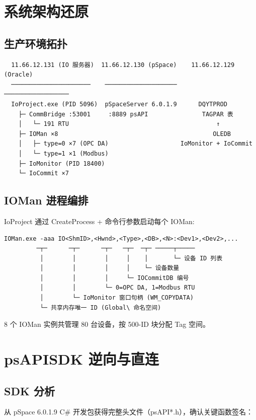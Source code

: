 \documentclass[12pt,a4paper]{ctexart}
\begin{document}
\section{系统架构还原}

\subsection{生产环境拓扑}
\begin{verbatim}
  11.66.12.131 (IO 服务器)  11.66.12.130 (pSpace)    11.66.12.129 (Oracle)
  ──────────────────────    ────────────────────      ──────────────────
  IoProject.exe (PID 5096)  pSpaceServer 6.0.1.9      DQYTPROD
    ├─ CommBridge :53001     :8889 psAPI               TAGPAR 表
    │   └─ 191 RTU                                         ↑
    ├─ IOMan ×8                                           OLEDB
    │   ├─ type=0 ×7 (OPC DA)                    IoMonitor + IoCommit
    │   └─ type=1 ×1 (Modbus)
    ├─ IoMonitor (PID 18400)
    └─ IoCommit ×7
\end{verbatim}

\subsection{IOMan 进程编排}
IoProject 通过 CreateProcess + 命令行参数启动每个 IOMan:

\begin{verbatim}
IOMan.exe -aaa IO<ShmID>,<Hwnd>,<Type>,<DB>,<N>:<Dev1>,<Dev2>,...
         ─┬─      ─┬─      ─┬─   ─┬─  ─┬─ ─────┬─────
          │        │        │     │    │       └─ 设备 ID 列表
          │        │        │     │    └─ 设备数量
          │        │        │     └─ IOCommitDB 编号
          │        │        └─ 0=OPC DA, 1=Modbus RTU
          │        └─ IoMonitor 窗口句柄 (WM_COPYDATA)
          └─ 共享内存唯一 ID (Global\ 命名空间)
\end{verbatim}

8 个 IOMan 实例共管理 80 台设备，按 500-ID 块分配 Tag 空间。

\section{psAPISDK 逆向与直连}

\subsection{SDK 分析}
从 pSpace 6.0.1.9 C\# 开发包获得完整头文件（psAPI*.h），确认关键函数签名：
\end{document}
